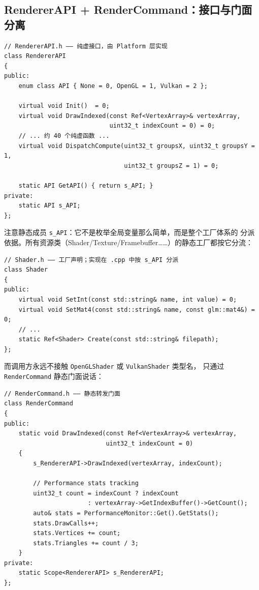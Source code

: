 \subsection{RendererAPI + RenderCommand：接口与门面分离}

\begin{lstlisting}
// RendererAPI.h —— 纯虚接口，由 Platform 层实现
class RendererAPI
{
public:
    enum class API { None = 0, OpenGL = 1, Vulkan = 2 };

    virtual void Init()  = 0;
    virtual void DrawIndexed(const Ref<VertexArray>& vertexArray,
                             uint32_t indexCount = 0) = 0;
    // ... 约 40 个纯虚函数 ...
    virtual void DispatchCompute(uint32_t groupsX, uint32_t groupsY = 1,
                                 uint32_t groupsZ = 1) = 0;

    static API GetAPI() { return s_API; }
private:
    static API s_API;
};
\end{lstlisting}

注意静态成员 \texttt{s\_API}：它不是枚举全局变量那么简单，而是整个工厂体系的
分派依据。所有资源类（Shader/Texture/Framebuffer……）的静态工厂都按它分流：

\begin{lstlisting}
// Shader.h —— 工厂声明；实现在 .cpp 中按 s_API 分派
class Shader
{
public:
    virtual void SetInt(const std::string& name, int value) = 0;
    virtual void SetMat4(const std::string& name, const glm::mat4&) = 0;
    // ...
    static Ref<Shader> Create(const std::string& filepath);
};
\end{lstlisting}

而调用方永远不接触 \texttt{OpenGLShader} 或 \texttt{VulkanShader} 类型名，
只通过 \texttt{RenderCommand} 静态门面说话：

\begin{lstlisting}
// RenderCommand.h —— 静态转发门面
class RenderCommand
{
public:
    static void DrawIndexed(const Ref<VertexArray>& vertexArray,
                            uint32_t indexCount = 0)
    {
        s_RendererAPI->DrawIndexed(vertexArray, indexCount);

        // Performance stats tracking
        uint32_t count = indexCount ? indexCount
                       : vertexArray->GetIndexBuffer()->GetCount();
        auto& stats = PerformanceMonitor::Get().GetStats();
        stats.DrawCalls++;
        stats.Vertices += count;
        stats.Triangles += count / 3;
    }
private:
    static Scope<RendererAPI> s_RendererAPI;
};
\end{lstlisting}

